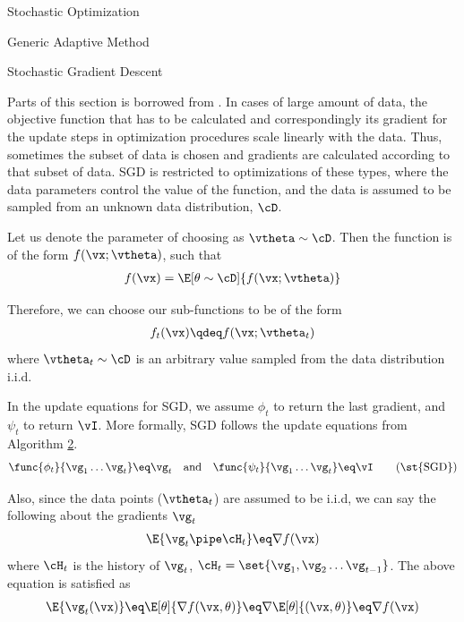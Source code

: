 \documentclass{article}
\begin{document}
\begin{psection}{Stochastic Optimization}
\begin{algo}[0.9\textwidth]{Generic Adaptive Method}
	\end{algo}

	\begin{psubsection}{Stochastic Gradient Descent}

		Parts of this section is borrowed from \cite{sgd}. In cases of large amount of data, the objective function that has to be calculated and correspondingly its gradient for the update steps in optimization procedures scale linearly with the data. Thus, sometimes the subset of data is chosen and gradients are calculated according to that subset of data. SGD is restricted to optimizations of these types, where the data parameters control the value of the function, and the data is assumed to be sampled from an unknown data distribution, $\cD$.

		Let us denote the parameter of choosing as $\vtheta \sim \cD$. Then the function is of the form $f(\vx; \vtheta)$, such that
		\begin{align*}
			f(\vx)=\E[\theta\sim\cD]{f(\vx; \vtheta)}
		\end{align*}

		Therefore, we can choose our sub-functions to be of the form
		\begin{align*}
			f_t(\vx) \qdeq f(\vx; \vtheta_t)
		\end{align*}
		where $\vtheta_t \sim \cD$ is an arbitrary value sampled from the data distribution i.i.d.

		In the update equations for SGD, we assume $\phi_t$ to return the last gradient, and $\psi_t$ to return $\vI$. More formally, SGD follows the update equations from Algorithm \hyperlink{algo:2}{2}.
		\begin{equation}
			\func{\phi_t}{\vg_1 \dots \vg_t} \eq \vg_t \quad\text{and}\quad	\func{\psi_t}{\vg_1 \dots \vg_t} \eq \vI
			\tag{\st{SGD}}
		\end{equation}

		Also, since the data points ($\vtheta_t$) are assumed to be i.i.d, we can say the following about the gradients $\vg_t$
		\begin{align*}
			\E{\vg_t \pipe \cH_t} \eq \nabla f(\vx)
		\end{align*}
		where $\cH_t$ is the history of $\vg_t$, $\cH_t = \set{\vg_1,\vg_2 \dots \vg_{t-1}}$. The above equation is satisfied as
		\begin{align*}
			\E{\vg_t(\vx)} \eq \E[\theta]{\nabla f(\vx,\theta)} \eq \nabla \E[\theta]{(\vx,\theta)} \eq \nabla f(\vx)
		\end{align*}


\end{psubsection}
\end{psection}
\end{document}
